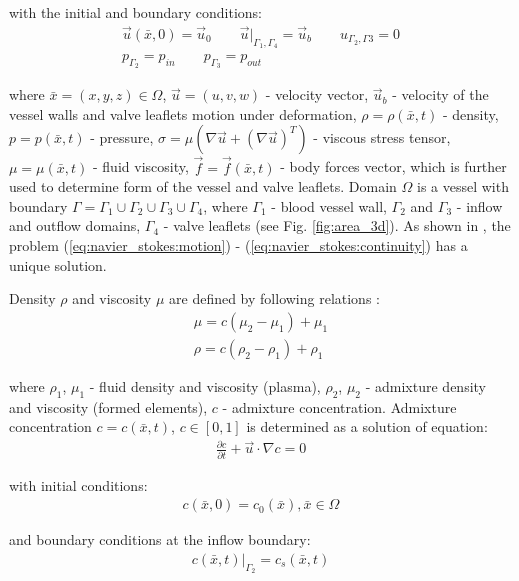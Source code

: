 \documentclass[runningheads,a4paper]{llncs}
\begin{document}
with the initial and boundary conditions:
\begin{gather}
    \label{eq:navier_stokes:velocity_conditions}
    \vec{u}(\bar{x}, 0) = \vec{u}_0 \qquad \vec{u}|_{\Gamma_1, \Gamma_4} = \vec{u}_b \qquad u_{\Gamma_2, \Gamma3} = 0\\
    \label{eq:navier_stokes:pressure_conditions}
    p_{\Gamma_2} = p_{in} \qquad p_{\Gamma_3} = p_{out}
\end{gather}

where $\bar{x}=(x,y,z) \in \Omega$, $\vec{u}=(u,v,w)$ - velocity vector, $\vec{u}_b$ - velocity of the vessel walls and valve leaflets motion under deformation,
$\rho=\rho(\bar{x}, t)$ - density, $p=p(\bar{x}, t)$ - pressure, $\sigma = \mu (\nabla \vec{u} + (\nabla \vec{u})^T)$ - viscous stress tensor,
$\mu = \mu(\bar{x}, t)$ - fluid viscosity, $\vec{f} = \vec{f}(\bar{x}, t)$ - body forces vector, which is further used to determine form of the vessel and valve leaflets.
Domain $\Omega$ is a vessel with boundary $\Gamma = \Gamma_1 \cup \Gamma_2 \cup \Gamma_3 \cup \Gamma_4$, where $\Gamma_1$ - blood vessel wall,
$\Gamma_2$ and $\Gamma_3$ - inflow and outflow domains, $\Gamma_4$ - valve leaflets (see Fig. \ref{fig:area_3d}).
As shown in \cite{ragulin}, the problem (\ref{eq:navier_stokes:motion}) - (\ref{eq:navier_stokes:continuity}) has a unique solution.

Density $\rho$ and viscosity $\mu$ are defined by following relations \cite{gummel}:
\begin{gather}
    \label{eq:viscosity}
    \mu = c (\mu_2 - \mu_1) + \mu_1\\
    \label{eq:density}
    \rho = c (\rho_2 - \rho_1) + \rho_1
\end{gather}

where $\rho_1$, $\mu_1$ - fluid density and viscosity (plasma), $\rho_2$, $\mu_2$ - admixture density and viscosity (formed elements), $c$ - admixture concentration.
Admixture concentration $c=c(\bar{x}, t)$, $c \in [0, 1]$ is determined as a solution of equation:
\begin{gather}
    \label{eq:convection}
    \frac{\partial c}{\partial t} + \vec{u} \cdot \nabla c = 0
\end{gather}

with initial conditions:
\begin{gather}
    \label{eq:convection:conditions}
    c(\bar{x}, 0) = c_0(\bar{x}), \bar{x} \in \Omega
\end{gather}

and boundary conditions at the inflow boundary:
\begin{gather}
    \label{eq:convection:conditions}
    c(\bar{x}, t)|_{\Gamma_2} = c_s(\bar{x}, t)
\end{gather}
\end{document}
